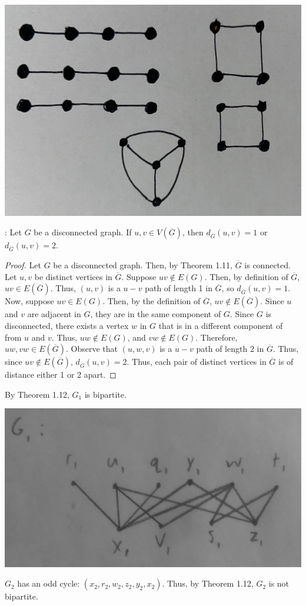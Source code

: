 \documentclass[12pt]{article}
\begin{document}
\bigskip
{}
\begin{center}
\includegraphics[scale=.05]{HW2-graph1.JPG}
\end{center}

\bigskip
{}

: Let $G$ be a disconnected graph. If $u,v \in V(\overline{G})$, then $d_{\overline{G}}(u,v) = 1$ or $d_{\overline{G}}(u,v) = 2$.
\begin{proof}
Let $G$ be a disconnected graph.
Then, by Theorem 1.11, $\overline{G}$ is connected.
Let $u,v$ be distinct vertices in $\overline G$.
Suppose $uv \notin E(G)$.
Then, by definition of $\overline{G}$, $uv \in E(\overline{G})$.
Thus, $(u,v)$ is a $u-v$ path of length 1 in $\overline G$, so $d_{\overline{G}}(u,v) = 1$.
Now, suppose $uv \in E(G)$.
Then, by the definition of $\overline{G}$, $uv \notin E({\overline{G}})$.
Since $u$ and $v$ are adjacent in $G$, they are in the same component of $G$.
Since $G$ is disconnected, there exists a vertex $w$ in $G$ that is in a different component of from $u$ and $v$.
Thus, $uw \notin E(G)$, and $vw \notin E(G)$.
Therefore, $uw, vw \in E(\overline G)$.
Observe that $(u, w, v)$ is a $u-v$ path of length $2$ in $\overline G$.
Thus, since $uv \notin E(\overline G)$, $d_{\overline{G}}(u,v) = 2$.
Thus, each pair of distinct vertices in $\overline G$ is of distance either 1 or 2 apart.
\end{proof}

\bigskip
{}

    By Theorem 1.12, $G_1$ is bipartite.

    \begin{center}
    \includegraphics[scale=.1]{graph.jpg}
    \end{center}

    $G_2$ has an odd cycle: $(x_2, r_2, w_2, z_2, y_2, x_2)$. Thus, by Theorem 1.12, $G_2$ is not bipartite.
\end{document}
